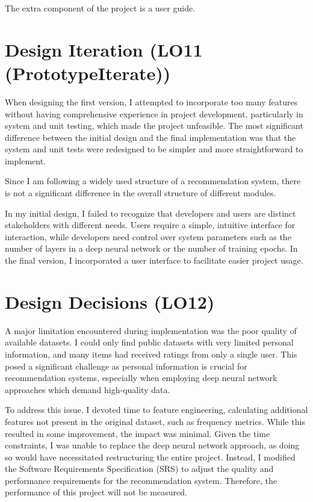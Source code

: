 \documentclass{article}
\begin{document}
The extra component of the project is a user guide.

\section{Design Iteration (LO11 (PrototypeIterate))}

When designing the first version, I attempted to incorporate too many features without having comprehensive experience in project development, particularly in system and unit testing, which made the project unfeasible. The most significant difference between the initial design and the final implementation was that the system and unit tests were redesigned to be simpler and more straightforward to implement.

Since I am following a widely used structure of a recommendation system, there is not a significant difference in the overall structure of different modules.

In my initial design, I failed to recognize that developers and users are distinct stakeholders with different needs. Users require a simple, intuitive interface for interaction, while developers need control over system parameters such as the number of layers in a deep neural network or the number of training epochs. In the final version, I incorporated a user interface to facilitate easier project usage.

\section{Design Decisions (LO12)}

A major limitation encountered during implementation was the poor quality of available datasets. I could only find public datasets with very limited personal information, and many items had received ratings from only a single user. This posed a significant challenge as personal information is crucial for recommendation systems, especially when employing deep neural network approaches which demand high-quality data.

To address this issue, I devoted time to feature engineering, calculating additional features not present in the original dataset, such as frequency metrics. While this resulted in some improvement, the impact was minimal. Given the time constraints, I was unable to replace the deep neural network approach, as doing so would have necessitated restructuring the entire project. Instead, I modified the Software Requirements Specification (SRS) to adjust the quality and performance requirements for the recommendation system. Therefore, the performance of this project will not be measured.
\end{document}

